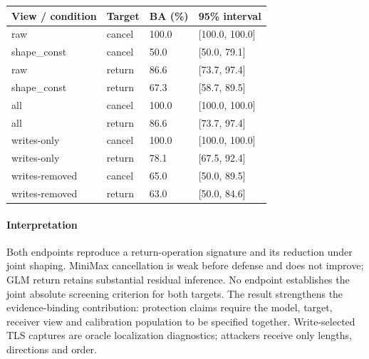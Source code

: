 \begin{center}\begin{tabular}{llll}\toprule

View / condition & Target & BA (\%) & 95\% interval\\\midrule

raw & cancel & 100.0 & [100.0, 100.0]\\

shape\_const & cancel & 50.0 & [50.0, 79.1]\\

raw & return & 86.6 & [73.7, 97.4]\\

shape\_const & return & 67.3 & [58.7, 89.5]\\

all & cancel & 100.0 & [100.0, 100.0]\\

all & return & 86.6 & [73.7, 97.4]\\

writes-only & cancel & 100.0 & [100.0, 100.0]\\

writes-only & return & 78.1 & [67.5, 92.4]\\

writes-removed & cancel & 65.0 & [50.0, 89.5]\\

writes-removed & return & 63.0 & [50.0, 84.6]\\

\bottomrule\end{tabular}\end{center}

\paragraph{Interpretation} Both endpoints reproduce a return-operation signature and its reduction under joint shaping. MiniMax cancellation is weak before defense and does not improve; GLM return retains substantial residual inference. No endpoint establishes the joint absolute screening criterion for both targets. The result strengthens the evidence-binding contribution: protection claims require the model, target, receiver view and calibration population to be specified together. Write-selected TLS captures are oracle localization diagnostics; attackers receive only lengths, directions and order.
